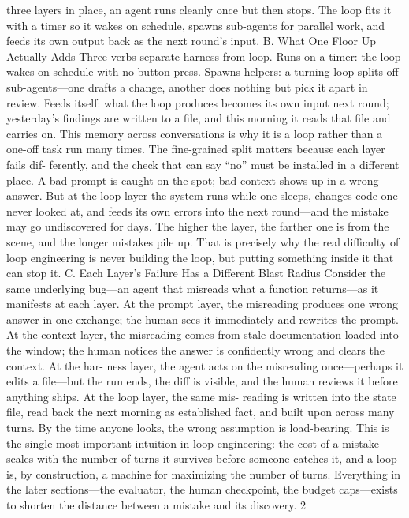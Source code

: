 \documentclass[conference]{IEEEtran}
\begin{document}
three layers in place, an agent runs cleanly once but then stops.
The loop fits it with a timer so it wakes on schedule, spawns
sub-agents for parallel work, and feeds its own output back as
the next round’s input.
B. What One Floor Up Actually Adds
Three verbs separate harness from loop. Runs on a timer: the
loop wakes on schedule with no button-press. Spawns helpers: a
turning loop splits off sub-agents—one drafts a change, another
does nothing but pick it apart in review. Feeds itself: what the
loop produces becomes its own input next round; yesterday’s
findings are written to a file, and this morning it reads that file
and carries on. This memory across conversations is why it is a
loop rather than a one-off task run many times.
The fine-grained split matters because each layer fails dif-
ferently, and the check that can say “no” must be installed in a
different place. A bad prompt is caught on the spot; bad context
shows up in a wrong answer. But at the loop layer the system
runs while one sleeps, changes code one never looked at, and
feeds its own errors into the next round—and the mistake may
go undiscovered for days. The higher the layer, the farther one is
from the scene, and the longer mistakes pile up. That is precisely
why the real difficulty of loop engineering is never building the
loop, but putting something inside it that can stop it.
C. Each Layer’s Failure Has a Different Blast Radius
Consider the same underlying bug—an agent that misreads
what a function returns—as it manifests at each layer. At the
prompt layer, the misreading produces one wrong answer in
one exchange; the human sees it immediately and rewrites the
prompt. At the context layer, the misreading comes from stale
documentation loaded into the window; the human notices the
answer is confidently wrong and clears the context. At the har-
ness layer, the agent acts on the misreading once—perhaps it
edits a file—but the run ends, the diff is visible, and the human
reviews it before anything ships. At the loop layer, the same mis-
reading is written into the state file, read back the next morning
as established fact, and built upon across many turns. By the
time anyone looks, the wrong assumption is load-bearing.
This is the single most important intuition in loop engineering:
the cost of a mistake scales with the number of turns it survives
before someone catches it, and a loop is, by construction, a
machine for maximizing the number of turns. Everything in the
later sections—the evaluator, the human checkpoint, the budget
caps—exists to shorten the distance between a mistake and its
discovery.
2
\end{document}
